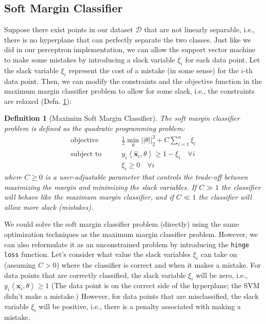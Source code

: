 \documentclass{article}[11pt]
\newtheorem{defn}{Definition}
\newcommand{\norm}[1]{\left|\left|#1\right|\right|}
\begin{document}
\subsection{Soft Margin Classifier}\label{sec:soft-margin}
Suppose there exist points in our dataset $\mathcal{D}$ that are not linearly separable, i.e., there is no hyperplane that can perfectly separate the two classes.
Just like we did in our perceptron implementation, we can allow the support vector machine to make some mistakes by introducing a slack variable $\xi_{i}$ for each data point.
Let the slack variable $\xi_{i}$ represent the cost of a mistake (in some sense) for the $i$-th data point.
Then, we can modify the constraints and the objective function in the maximum margin classifier problem to allow for some slack, i.e., the constraints are relaxed (Defn. \ref{defn:soft-margin}):
\begin{mdframed}
\begin{defn}[Maximim Soft Margin Classifier]\label{defn:soft-margin}
The soft margin classifier problem is defined as the quadratic programming problem:
\begin{align*}
    \text{objective}\qquad & \frac{1}{2}\min_{\theta}\norm{\theta}_{2}^{2} + C\sum_{i=1}^{n}\xi_{i}\\
    \text{subject to}\qquad & y_{i}\left<\hat{\mathbf{x}}_{i},\theta\right> \geq 1 - \xi_{i}\quad\forall i\\
    & \xi_{i} \geq 0\quad\forall i
\end{align*}
where $C\geq{0}$ is a user-adjustable parameter that controls the trade-off between maximizing the margin and minimizing the slack variables.
If $C\gg{1}$ the classifier will behave like the maximum margin classifier, and if $C\ll{1}$ the classifier will allow more slack (mistakes).
\end{defn}
\end{mdframed}
We could solve the soft margin classifier problem (directly) using the same optimization techniques as the maximum margin classifier problem.
However, we can also reformulate it as an unconstrained problem by introducing the \texttt{hinge loss} function. 
Let's consider what value the slack variables $\xi_{i}$ can take on (assuming $C>{0}$) where the classifier is correct and when it makes a mistake.
For data points that are correctly classified, the slack variable $\xi_{i}$ will be zero, i.e., $y_{i}\left<\hat{\mathbf{x}}_{i},\theta\right> \geq 1$ 
(The data point is on the correct side of the hyperplane; the SVM didn't make a mistake.) 
However, for data points that are misclassified, the slack variable $\xi_{i}$ will be positive, i.e., there is a penalty associated with making a mistake. 
\end{document}
